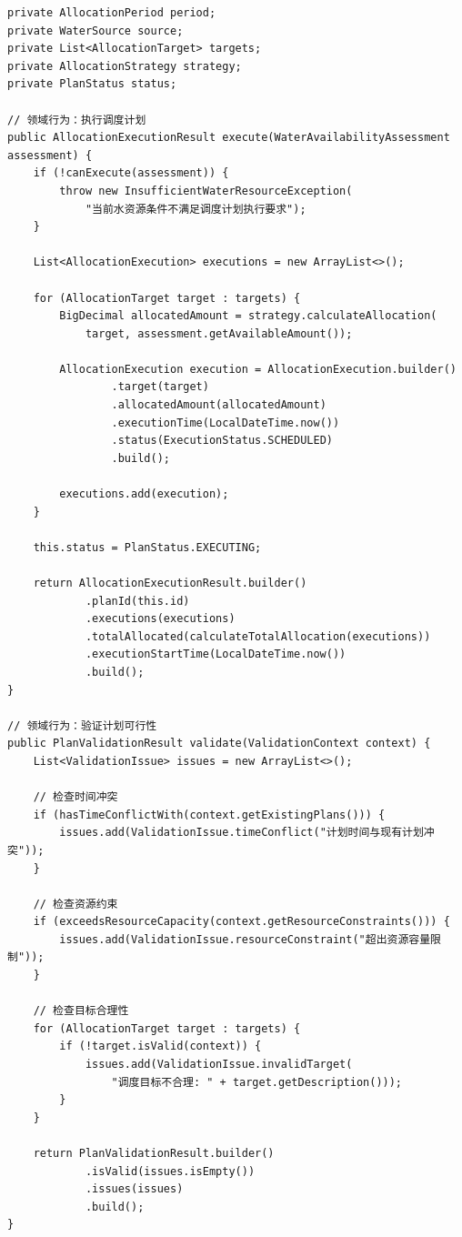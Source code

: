 \begin{verbatim}
private AllocationPeriod period;
private WaterSource source;
private List<AllocationTarget> targets;
private AllocationStrategy strategy;
private PlanStatus status;

// 领域行为：执行调度计划
public AllocationExecutionResult execute(WaterAvailabilityAssessment assessment) {
    if (!canExecute(assessment)) {
        throw new InsufficientWaterResourceException(
            "当前水资源条件不满足调度计划执行要求");
    }
    
    List<AllocationExecution> executions = new ArrayList<>();
    
    for (AllocationTarget target : targets) {
        BigDecimal allocatedAmount = strategy.calculateAllocation(
            target, assessment.getAvailableAmount());
            
        AllocationExecution execution = AllocationExecution.builder()
                .target(target)
                .allocatedAmount(allocatedAmount)
                .executionTime(LocalDateTime.now())
                .status(ExecutionStatus.SCHEDULED)
                .build();
                
        executions.add(execution);
    }
    
    this.status = PlanStatus.EXECUTING;
    
    return AllocationExecutionResult.builder()
            .planId(this.id)
            .executions(executions)
            .totalAllocated(calculateTotalAllocation(executions))
            .executionStartTime(LocalDateTime.now())
            .build();
}

// 领域行为：验证计划可行性
public PlanValidationResult validate(ValidationContext context) {
    List<ValidationIssue> issues = new ArrayList<>();
    
    // 检查时间冲突
    if (hasTimeConflictWith(context.getExistingPlans())) {
        issues.add(ValidationIssue.timeConflict("计划时间与现有计划冲突"));
    }
    
    // 检查资源约束
    if (exceedsResourceCapacity(context.getResourceConstraints())) {
        issues.add(ValidationIssue.resourceConstraint("超出资源容量限制"));
    }
    
    // 检查目标合理性
    for (AllocationTarget target : targets) {
        if (!target.isValid(context)) {
            issues.add(ValidationIssue.invalidTarget(
                "调度目标不合理: " + target.getDescription()));
        }
    }
    
    return PlanValidationResult.builder()
            .isValid(issues.isEmpty())
            .issues(issues)
            .build();
}
\end{verbatim}

